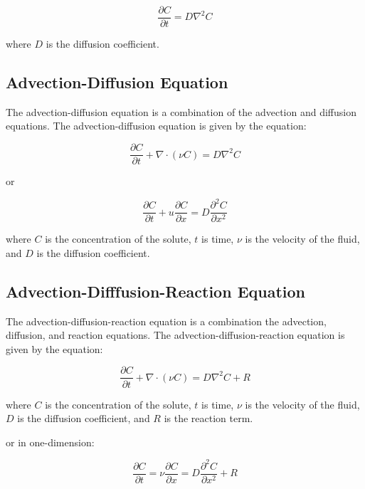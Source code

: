 \documentclass{tufte-handout}\usepackage[]{graphicx}\usepackage[]{xcolor}
\begin{document}
\begin{equation}
\frac{\partial C}{\partial t} = D \nabla^2 C
\end{equation}

where $D$ is the diffusion coefficient.

\subsection{Advection-Diffusion Equation}

The advection-diffusion equation is a combination of the advection and diffusion equations. The advection-diffusion equation is given by the equation:

\begin{equation}
\frac{\partial C}{\partial t} + \nabla \cdot (\nu C) = D \nabla^2 C
\end{equation}

or 

\begin{equation}
\frac{\partial C}{\partial t} + u \frac{\partial C}{\partial x} = D \frac{\partial^2 C}{\partial x^2}
\end{equation}

where $C$ is the concentration of the solute, $t$ is time, $\nu$ is the velocity of the fluid, and $D$ is the diffusion coefficient.

\subsection{Advection-Difffusion-Reaction Equation}

The advection-diffusion-reaction equation is a combination the advection, diffusion, and reaction equations. The advection-diffusion-reaction equation is given by the equation:

\begin{equation}
\frac{\partial C}{\partial t} + \nabla \cdot (\nu C) = D \nabla^2 C + R
\end{equation}

where $C$ is the concentration of the solute, $t$ is time, $\nu$ is the velocity of the fluid, $D$ is the diffusion coefficient, and $R$ is the reaction term.

or in one-dimension:

\begin{equation}
\frac{\partial C}{\partial t} = \nu \frac{\partial C}{\partial x} = D \frac{\partial^2 C}{\partial x^2} + R
\end{equation}
\end{document}
